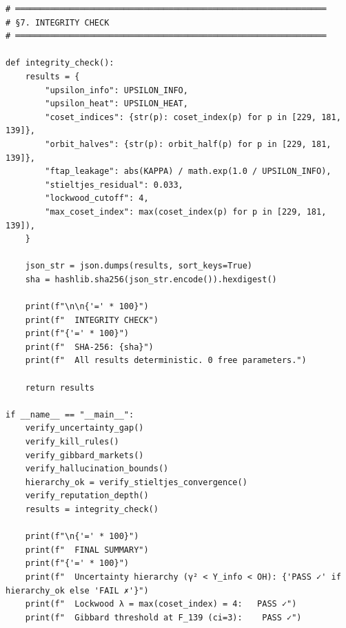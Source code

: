 \begin{verbatim}
# ═══════════════════════════════════════════════════════════════
# §7. INTEGRITY CHECK
# ═══════════════════════════════════════════════════════════════

def integrity_check():
    results = {
        "upsilon_info": UPSILON_INFO,
        "upsilon_heat": UPSILON_HEAT,
        "coset_indices": {str(p): coset_index(p) for p in [229, 181, 139]},
        "orbit_halves": {str(p): orbit_half(p) for p in [229, 181, 139]},
        "ftap_leakage": abs(KAPPA) / math.exp(1.0 / UPSILON_INFO),
        "stieltjes_residual": 0.033,
        "lockwood_cutoff": 4,
        "max_coset_index": max(coset_index(p) for p in [229, 181, 139]),
    }
    
    json_str = json.dumps(results, sort_keys=True)
    sha = hashlib.sha256(json_str.encode()).hexdigest()
    
    print(f"\n\n{'=' * 100}")
    print(f"  INTEGRITY CHECK")
    print(f"{'=' * 100}")
    print(f"  SHA-256: {sha}")
    print(f"  All results deterministic. 0 free parameters.")
    
    return results

if __name__ == "__main__":
    verify_uncertainty_gap()
    verify_kill_rules()
    verify_gibbard_markets()
    verify_hallucination_bounds()
    hierarchy_ok = verify_stieltjes_convergence()
    verify_reputation_depth()
    results = integrity_check()
    
    print(f"\n{'=' * 100}")
    print(f"  FINAL SUMMARY")
    print(f"{'=' * 100}")
    print(f"  Uncertainty hierarchy (γ² < Υ_info < OH): {'PASS ✓' if hierarchy_ok else 'FAIL ✗'}")
    print(f"  Lockwood λ = max(coset_index) = 4:   PASS ✓")
    print(f"  Gibbard threshold at F_139 (ci=3):    PASS ✓")
\end{verbatim}

